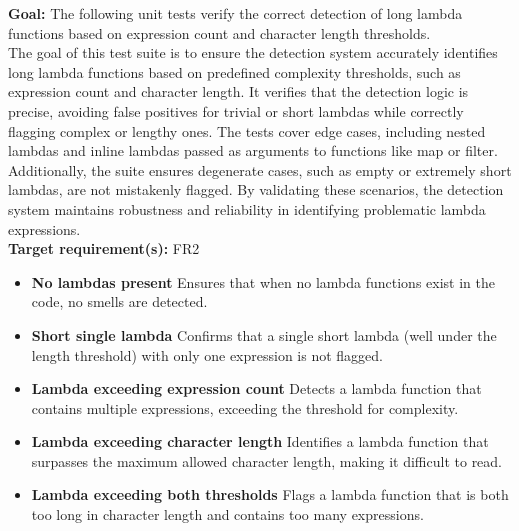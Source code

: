 \documentclass[12pt, titlepage]{article}
\begin{document}
\begin{enumerate}[label={\bf \textcolor{Maroon}{test-SRT-\arabic*}}, wide=0pt, font=\itshape]
\textbf{Goal:} The following unit tests verify the correct detection of long lambda functions based on expression count and character length thresholds.\\

\noindent The goal of this test suite is to ensure the detection system accurately identifies long lambda 
functions based on predefined complexity thresholds, such as expression count and character 
length. It verifies that the detection logic is precise, avoiding false positives for trivial 
or short lambdas while correctly flagging complex or lengthy ones. The tests cover edge cases, 
including nested lambdas and inline lambdas passed as arguments to functions like map or 
filter. Additionally, the suite ensures degenerate cases, such as empty or extremely short 
lambdas, are not mistakenly flagged. By validating these scenarios, the detection system 
maintains robustness and reliability in identifying problematic lambda expressions.\\

\noindent\textbf{Target requirement(s):} FR2 ~\cite{SRS} \\

\begin{itemize}
    \item \textbf{No lambdas present} \newline
    Ensures that when no lambda functions exist in the code, no smells are detected.
    
    \item \textbf{Short single lambda} \newline
    Confirms that a single short lambda (well under the length threshold) with only one expression is not flagged.

    \item \textbf{Lambda exceeding expression count} \newline
    Detects a lambda function that contains multiple expressions, exceeding the threshold for complexity.

    \item \textbf{Lambda exceeding character length} \newline
    Identifies a lambda function that surpasses the maximum allowed character length, making it difficult to read.

    \item \textbf{Lambda exceeding both thresholds} \newline
    Flags a lambda function that is both too long in character length and contains too many expressions.


\end{itemize}
\end{enumerate}
\end{document}
